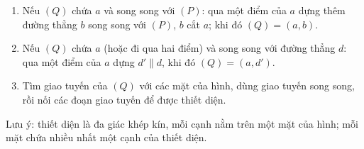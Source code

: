 \begin{enumerate}
\item Nếu $(Q)$ chứa $a$ và song song với $(P)$: qua một điểm của $a$ dựng thêm đường thẳng $b$ song song với $(P)$, $b$ cắt $a$; khi đó $(Q)=(a,b)$.
\item Nếu $(Q)$ chứa $a$ (hoặc đi qua hai điểm) và song song với đường thẳng $d$: qua một điểm của $a$ dựng $d'\parallel d$, khi đó $(Q)=(a,d')$.
\item Tìm giao tuyến của $(Q)$ với các mặt của hình, dùng giao tuyến song song, rồi nối các đoạn giao tuyến để được thiết diện.
\end{enumerate}
Lưu ý: thiết diện là đa giác khép kín, mỗi cạnh nằm trên một mặt của hình; mỗi mặt chứa nhiều nhất một cạnh của thiết diện.
